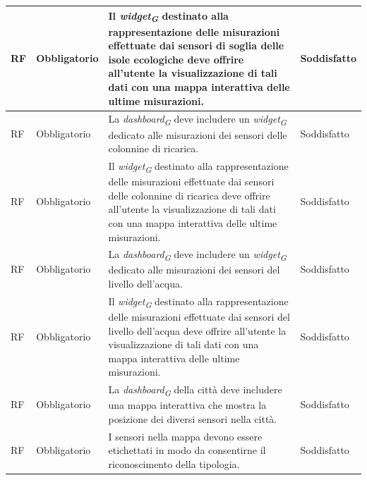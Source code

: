 \begin{longtable}{|C{1.5cm}|C{2cm}|L{5cm}|C{2cm}|}
    \hline
     RF & Obbligatorio &Il \textit{widget}\textsubscript{\textit{G}} destinato alla rappresentazione delle misurazioni effettuate dai sensori di soglia delle isole ecologiche deve offrire all'utente la visualizzazione di tali dati con una mappa interattiva delle ultime misurazioni.  & Soddisfatto \\
    
    \hline
     RF & Obbligatorio & La \textit{dashboard}\textsubscript{\textit{G}} deve includere un \textit{widget}\textsubscript{\textit{G}} dedicato alle misurazioni dei sensori delle colonnine di ricarica. & Soddisfatto \\
    
    \hline
     RF & Obbligatorio &Il \textit{widget}\textsubscript{\textit{G}} destinato alla rappresentazione delle misurazioni effettuate dai sensori delle colonnine di ricarica deve offrire all'utente la visualizzazione di tali dati con una mappa interattiva delle ultime misurazioni.  & Soddisfatto \\
    
    \hline
     RF & Obbligatorio & La \textit{dashboard}\textsubscript{\textit{G}} deve includere un \textit{widget}\textsubscript{\textit{G}} dedicato alle misurazioni dei sensori del livello dell'acqua. & Soddisfatto \\
    
    \hline
     RF & Obbligatorio &Il \textit{widget}\textsubscript{\textit{G}} destinato alla rappresentazione delle misurazioni effettuate dai sensori del livello dell'acqua deve offrire all'utente la visualizzazione di tali dati con una mappa interattiva delle ultime misurazioni. & Soddisfatto \\
    
    \hline
     RF & Obbligatorio & La \textit{dashboard}\textsubscript{\textit{G}} della città deve includere una mappa interattiva che mostra la posizione dei diversi sensori nella città.& Soddisfatto \\
    
    \hline
     RF & Obbligatorio & I sensori nella mappa devono essere etichettati in modo da consentirne il riconoscimento della tipologia.& Soddisfatto \\
    

\end{longtable}
